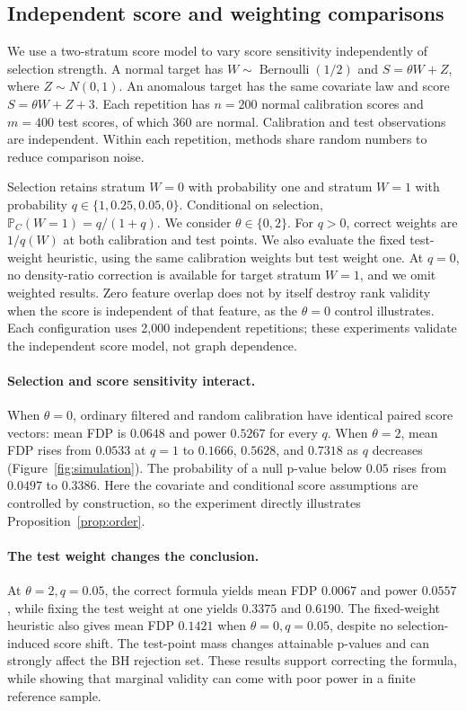 \documentclass[twoside]{article}
\newcommand{\Prb}{\mathbb{P}}
\begin{document}
\subsection{Independent score and weighting comparisons}
We use a two-stratum score model to vary score sensitivity independently of selection strength. A normal target has $W\sim\operatorname{Bernoulli}(1/2)$ and $S=\theta W+Z$, where $Z\sim N(0,1)$. An anomalous target has the same covariate law and score $S=\theta W+Z+3$. Each repetition has $n=200$ normal calibration scores and $m=400$ test scores, of which 360 are normal. Calibration and test observations are independent. Within each repetition, methods share random numbers to reduce comparison noise.

Selection retains stratum $W=0$ with probability one and stratum $W=1$ with probability $q\in\{1,0.25,0.05,0\}$. Conditional on selection, $\Prb_C(W=1)=q/(1+q)$. We consider $\theta\in\{0,2\}$. For $q>0$, correct weights are $1/q(W)$ at both calibration and test points. We also evaluate the fixed test-weight heuristic, using the same calibration weights but test weight one. At $q=0$, no density-ratio correction is available for target stratum $W=1$, and we omit weighted results. Zero feature overlap does not by itself destroy rank validity when the score is independent of that feature, as the $\theta=0$ control illustrates. Each configuration uses 2,000 independent repetitions; these experiments validate the independent score model, not graph dependence.

\paragraph{Selection and score sensitivity interact.}
When $\theta=0$, ordinary filtered and random calibration have identical paired score vectors: mean FDP is $0.0648$ and power $0.5267$ for every $q$. When $\theta=2$, mean FDP rises from $0.0533$ at $q=1$ to $0.1666$, $0.5628$, and $0.7318$ as $q$ decreases (Figure~\ref{fig:simulation}). The probability of a null p-value below $0.05$ rises from $0.0497$ to $0.3386$. Here the covariate and conditional score assumptions are controlled by construction, so the experiment directly illustrates Proposition~\ref{prop:order}.

\paragraph{The test weight changes the conclusion.}
At $\theta=2,q=0.05$, the correct formula yields mean FDP $0.0067$ and power $0.0557$, while fixing the test weight at one yields $0.3375$ and $0.6190$. The fixed-weight heuristic also gives mean FDP $0.1421$ when $\theta=0,q=0.05$, despite no selection-induced score shift. The test-point mass changes attainable p-values and can strongly affect the BH rejection set. These results support correcting the formula, while showing that marginal validity can come with poor power in a finite reference sample.
\end{document}

